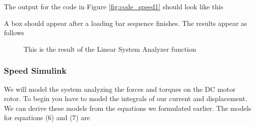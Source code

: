 \begin{flushleft}
\noindent The output for the code in Figure \ref{fig:code_speed1} should look like this 
\end{flushleft}
\break
\noindent A box should appear after a loading bar sequence finishes. The results appear as follows

\begin{figure}[H]
\centering
{}
\caption{\label{fig:code_speedLSA} This is the result of the Linear System Analyzer function}
\end{figure}
	\subsubsection{Speed Simulink}
    We will model the system analyzing the forces and torques on the DC motor rotor. To begin you have to model the integrals of our current and displacement. We can derive these models from the equations we formulated earlier. The models for equations (6) and (7) are

